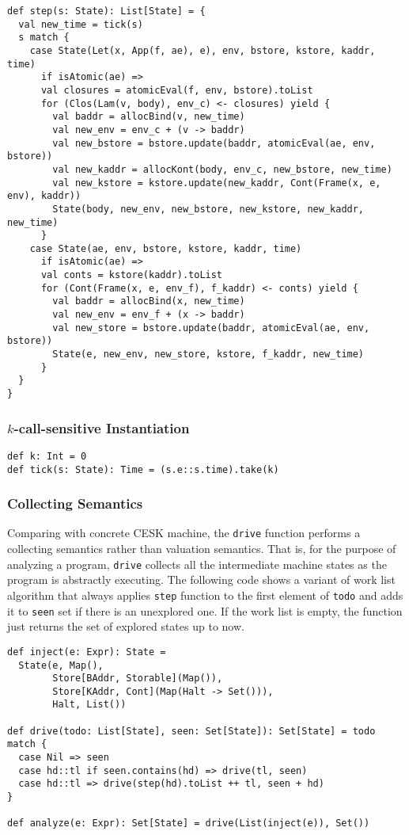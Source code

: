 \documentclass[acmsmall,review,anonymous]{acmart}\settopmatter{printfolios=true,printccs=false,printacmref=false}
\begin{document}
\begin{verbatim}
def step(s: State): List[State] = {
  val new_time = tick(s)
  s match {
    case State(Let(x, App(f, ae), e), env, bstore, kstore, kaddr, time) 
      if isAtomic(ae) =>
      val closures = atomicEval(f, env, bstore).toList
      for (Clos(Lam(v, body), env_c) <- closures) yield {
        val baddr = allocBind(v, new_time)
        val new_env = env_c + (v -> baddr)
        val new_bstore = bstore.update(baddr, atomicEval(ae, env, bstore))
        val new_kaddr = allocKont(body, env_c, new_bstore, new_time)
        val new_kstore = kstore.update(new_kaddr, Cont(Frame(x, e, env), kaddr))
        State(body, new_env, new_bstore, new_kstore, new_kaddr, new_time)
      }
    case State(ae, env, bstore, kstore, kaddr, time) 
      if isAtomic(ae) =>
      val conts = kstore(kaddr).toList
      for (Cont(Frame(x, e, env_f), f_kaddr) <- conts) yield {
        val baddr = allocBind(x, new_time)
        val new_env = env_f + (x -> baddr)
        val new_store = bstore.update(baddr, atomicEval(ae, env, bstore))
        State(e, new_env, new_store, kstore, f_kaddr, new_time)
      }
  }
}
\end{verbatim}

\subsubsection{$k$-call-sensitive Instantiation} \label{kcfainst}

\begin{verbatim}
def k: Int = 0
def tick(s: State): Time = (s.e::s.time).take(k)
\end{verbatim}

\subsubsection{Collecting Semantics}

Comparing with concrete CESK machine, the
\texttt{drive} function performs a collecting semantics rather than valuation
semantics. That is, for the purpose of analyzing a program, \texttt{drive}
collects all the intermediate machine states as the program is abstractly executing.
The following code shows a variant of work list algorithm that always applies \texttt{step}
function to the first element of \texttt{todo} and adds it to \texttt{seen} set
if there is an unexplored one. If the work list is empty, the function just
returns the set of explored states up to now.

\begin{verbatim}
def inject(e: Expr): State = 
  State(e, Map(), 
        Store[BAddr, Storable](Map()), 
        Store[KAddr, Cont](Map(Halt -> Set())), 
        Halt, List())

def drive(todo: List[State], seen: Set[State]): Set[State] = todo match {
  case Nil => seen
  case hd::tl if seen.contains(hd) => drive(tl, seen)
  case hd::tl => drive(step(hd).toList ++ tl, seen + hd)
}

def analyze(e: Expr): Set[State] = drive(List(inject(e)), Set())
\end{verbatim}
\end{document}
